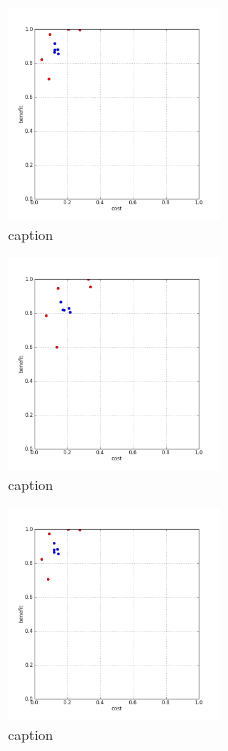 %
\begin{figure}[!ht]
	\centering
	\includegraphics[width=0.5\textwidth]{img/p1figs/computeFrameStateLauge_sectionCompareBetter_smooth0_tol48.png}
	\caption{caption}
\end{figure}
%
\begin{figure}[!ht]
	\centering
	\includegraphics[width=0.5\textwidth]{img/p1figs/computeFrameStateLauge_sectionCompareBetter_smooth12_tol24.png}
	\caption{caption}
\end{figure}
%
\begin{figure}[!ht]
	\centering
	\includegraphics[width=0.5\textwidth]{img/p1figs/computeFrameStateLauge_sectionCompareBetter_smooth12_tol48.png}
	\caption{caption}
\end{figure}
